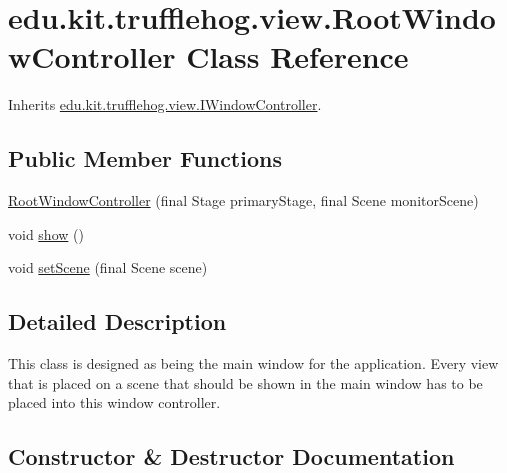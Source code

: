 \hypertarget{classedu_1_1kit_1_1trufflehog_1_1view_1_1_root_window_controller}{}\section{edu.\+kit.\+trufflehog.\+view.\+Root\+Window\+Controller Class Reference}
\label{classedu_1_1kit_1_1trufflehog_1_1view_1_1_root_window_controller}


Inherits \hyperlink{interfaceedu_1_1kit_1_1trufflehog_1_1view_1_1_i_window_controller}{edu.\+kit.\+trufflehog.\+view.\+I\+Window\+Controller}.

\subsection*{Public Member Functions}
\begin{DoxyCompactItemize}
\item 
\hyperlink{classedu_1_1kit_1_1trufflehog_1_1view_1_1_root_window_controller_afdad31fd3a0db74a603507f097d25b27}{Root\+Window\+Controller} (final Stage primary\+Stage, final Scene monitor\+Scene)
\item 
void \hyperlink{classedu_1_1kit_1_1trufflehog_1_1view_1_1_root_window_controller_a1c63b019592252ee2f5abfe73efcf377}{show} ()
\item 
void \hyperlink{classedu_1_1kit_1_1trufflehog_1_1view_1_1_root_window_controller_ae455b47ba1519c8ff6544b9723fb952b}{set\+Scene} (final Scene scene)
\end{DoxyCompactItemize}


\subsection{Detailed Description}
This class is designed as being the main window for the application. Every view that is placed on a scene that should be shown in the main window has to be placed into this window controller. 

\subsection{Constructor \& Destructor Documentation}
\hypertarget{classedu_1_1kit_1_1trufflehog_1_1view_1_1_root_window_controller_afdad31fd3a0db74a603507f097d25b27}{}
